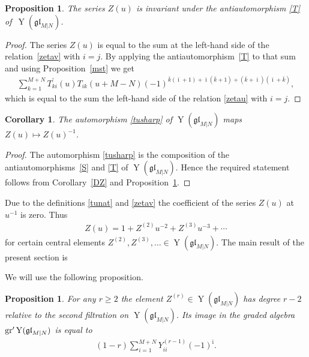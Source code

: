 \documentclass[10pt,a4paper]{amsart}
\numberwithin{equation}{section}
\newtheorem{Corollary}[Theorem]{Corollary}
\newtheorem{Proposition}[Theorem]{Proposition}
\def\bi{{\bar\imath }}
\def\bk{{\bar k }}
\def\glMN{\mathfrak{gl}_{M|N}}
\def\grpr{{\rm gr}^{\prime} }
\def\TP{T^{\prime}}
\def\YMN{\operatorname{Y}(\glMN)}
\begin{document}
\begin{Proposition}\label{TZ}The series $Z(u)$ is invariant under the antiautomorphism \eqref{T}
of~$\YMN $.
\end{Proposition}

\begin{proof}
The series $Z(u)$ is equal to the sum at the left-hand side of
the relation~\eqref{zetav} with $i=j $. By applying
the antiautomorphism~\eqref{T} to that sum and using Proposition~\ref{mst}
we get
\begin{gather*}
\sum_{k=1}^{M+N}
\TP_{ki}(u) T_{ik}(u+M-N)
{(-1)}^{\bk( \bi + 1) + \bi ( \bk + 1) +
( \bk + \bi )( \bi + \bk )},
\end{gather*}
which is equal
to the sum the left-hand side of the relation \eqref{zetau} with $i=j $.
\end{proof}

\begin{Corollary}\label{STZ}The automorphism \eqref{tusharp} of $\YMN$ maps $Z(u)\mapsto Z(u)^{-1} $.
\end{Corollary}

\begin{proof}The automorphism \eqref{tusharp} is the composition of the antiautomorphisms~\eqref{S} and \eqref{T} of $\YMN $. Hence the required statement follows from Corollary~\ref{DZ} and Proposition~\ref{TZ}.
\end{proof}

Due to the definitions \eqref{tunat} and \eqref{zetav}
the coefficient of the series $Z(u)$ at $u^{-1}$ is zero. Thus
\begin{gather}\label{zud}
Z(u)=1+Z^{(2)} u^{-2}+Z^{(3)} u^{-3}+\cdots
\end{gather}
for certain central elements $Z^{(2)},Z^{(3)},\ldots\in\YMN $.
The main result of the present section is

We will use the following proposition.

\begin{Proposition}
\label{P28}
For any $r\geqslant2$ the element
$Z^{(r)}\in\YMN$ has degree $r-2$
relative to the second filtration on $\YMN $. Its image
in the graded algebra $\grpr\YMN$ is equal to
\begin{gather}
\label{zim}
( 1-r ) \sum_{i=1}^{M+N} Y^{(r-1)}_{ii} (-1)^{\bi} .
\end{gather}
\end{Proposition}
\end{document}
